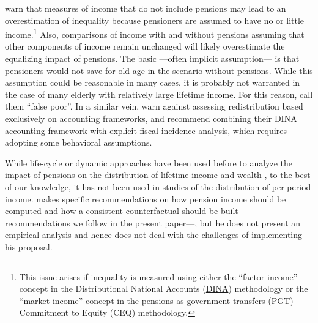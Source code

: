\documentclass{article}
\begin{document}
 \textcite{Coronado2011, Lustig2022c, Blanchet2021, Piketty2018} warn that measures of income that do not include pensions may lead to an overestimation of inequality  because pensioners are assumed to have no or little income.\footnote{This issue arises if inequality is measured using either the ``factor income'' concept in the Distributional National Accounts (\href{https://dina-project.net/wiki/Welcome_to_DINA}{DINA}) methodology or the ``market income'' concept in the pensions as government transfers (PGT) Commitment to Equity (CEQ) methodology.} Also, comparisons of income with and without pensions assuming that other components of income remain unchanged will likely overestimate the equalizing impact of pensions.  The basic ---often implicit assumption--- is that pensioners would not save for old age in the scenario without pensions. While this assumption could be reasonable in many cases, it is probably not warranted in the case of many elderly with relatively large lifetime income. For this reason, \textcite{Lustig2022c} call them  ``false poor''. In a similar vein, \textcite[][pp 57-8]{Blanchet2021} warn against assessing redistribution based exclusively on accounting frameworks, and recommend combining their DINA accounting framework with explicit fiscal incidence analysis, which requires adopting some behavioral assumptions. 

 While life-cycle or dynamic approaches have been used before to analyze the impact of pensions on the distribution of lifetime income and wealth \parencite{Wolff2015, Coronado2011, Belloni2019, Biggs2009, Fajnzylber2012, Forteza2014, Forteza2012, Moncarz2015, Zylberstajn2011, Wronski2022, Wronski2023}, to the best of our knowledge, it has not been used in studies of the distribution of per-period income. \textcite{Forteza2023}  makes specific recommendations on how pension income should be computed and how a consistent counterfactual should be built ---recommendations we follow in the present paper---, but he does not present an empirical analysis and hence does not deal with the challenges of implementing his proposal. 

\end{document}
